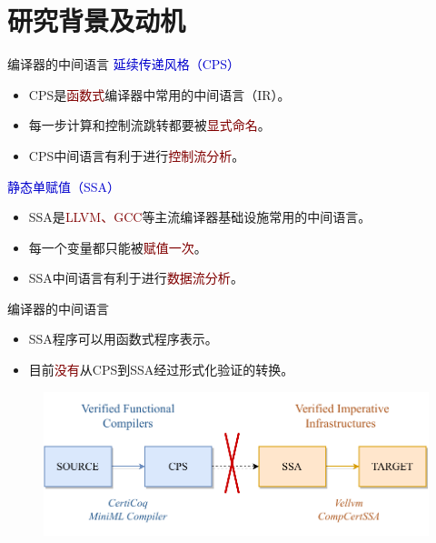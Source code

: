 
\section{研究背景及动机}

\begin{frame}{编译器的中间语言}
  \textcolor{MediumBlue}{延续传递风格（CPS）}
  \begin{itemize}
    \item CPS是\textcolor{Maroon}{函数式}编译器中常用的中间语言（IR）。
    \item 每一步计算和控制流跳转都要被\textcolor{Maroon}{显式命名}。
    \item CPS中间语言有利于进行\textcolor{Maroon}{控制流分析}。
  \end{itemize}
  \textcolor{MediumBlue}{静态单赋值（SSA）}
  \begin{itemize}
    \item SSA是\textcolor{Maroon}{LLVM、GCC}等主流编译器基础设施常用的中间语言。
    \item 每一个变量都只能被\textcolor{Maroon}{赋值一次}。
    \item SSA中间语言有利于进行\textcolor{Maroon}{数据流分析}。
  \end{itemize}
\end{frame}

\begin{frame}{编译器的中间语言}
    \begin{itemize}
      \item SSA程序可以用函数式程序表示。
      \item 目前\textcolor{Maroon}{没有}从CPS到SSA经过形式化验证的转换。
    \end{itemize}
    \begin{figure}
      \centering
      \includegraphics[width=0.7\linewidth]{figures/Motivation.drawio.pdf}
      \label{fig:moti1}
    \end{figure}
\end{frame}

